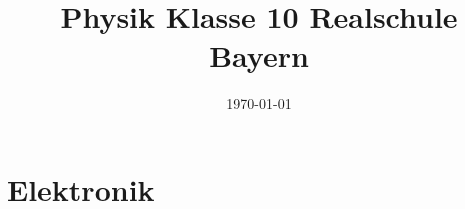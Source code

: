 \documentclass[a4paper, 12pt]{scrartcl}
\title{Physik Klasse 10 Realschule Bayern}
\date{\today}
\begin{document}
    \maketitle
    \tableofcontents
    \section {Elektronik}
    
    
    
    
    
    
    
    
    
\end{document}
